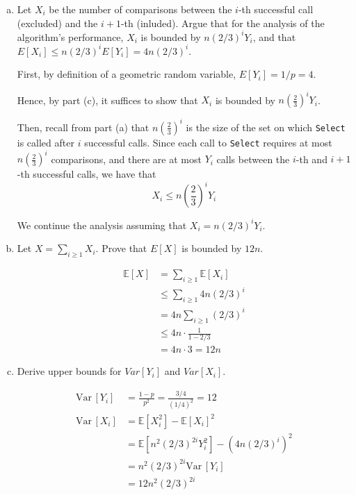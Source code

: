 \documentclass[12pt,letterpaper]{article}
\newcommand{\E}{\mathbb{E}}
\newcommand{\Var}{\text{Var}\,}
\renewcommand{\tt}[1]{\texttt{#1}}
\begin{document}
\begin{enumerate}[a.]
\color{black}

We continue the analysis assuming that for all $i$, the number of calls 
between the $i$-th successful call (excluded) and the $i+1$-th successful call (included) is distributed according to $Y_i$.

\item 
Let $X_i$ be the number of comparisons between the $i$-th successful call (excluded) and the $i+1$-th (inluded). Argue that for the analysis of the algorithm's performance, $X_i$ is bounded by $n(2/3)^i Y_i$, and  that $E[X_i] \leq n(2/3)^i E[Y_i] = 4n(2/3)^i$.

\color{darkblue}
    First, by definition of a geometric random variable, $E[Y_i] = 1/p = 4$. 

    Hence, by part (c), it suffices to show that $X_i$ is bounded by $n\left(\frac{2}{3}\right)^i Y_i$.

    Then, recall from part (a) that $n\left(\frac{2}{3}\right)^i$ is the size of the set on which \tt{Select} is called after $i$ successful calls. Since each call to \tt{Select} requires at most $n\left(\frac{2}{3}\right)^i$ comparisons, and there are at most $Y_i$ calls between the $i$-th and $i+1$-th successful calls, we have that
    \[X_i \leq n\left(\frac{2}{3}\right)^i Y_i\]
\color{black}

We continue the analysis assuming that $X_i = n(2/3)^i Y_i$.

\item Let $X=\sum_{i\geq 1}X_i$. Prove that $E[X]$ is bounded by $12n$.

\color{darkblue}
    \begin{align*}
        \E[X] &= \sum_{i \geq 1} \E[X_i]\\ 
        &\leq \sum_{i \geq 1} 4n(2/3)^i\\
        &= 4n \sum_{i \geq 1} (2/3)^i\\
        &\leq 4n \cdot \frac{1}{1 - 2/3}\\ 
        &= 4n \cdot 3 = 12n
    \end{align*}
\color{black}

\item Derive upper bounds for $Var[Y_i]$ and $Var[X_i]$.

\color{darkblue}
    \begin{align*}
        \Var[Y_i] &= \frac{1-p}{p^2} = \frac{3/4}{(1/4)^2} = 12\\
        \Var[X_i] &= \E[X_i^2] - \E[X_i]^2\\
        &= \E[n^2(2/3)^{2i} Y_i^2] - (4n(2/3)^i)^2\\
        &= n^2(2/3)^{2i} \Var[Y_i]\\
        &= 12 n^2 (2/3)^{2i}
    \end{align*}
\color{black}


\end{enumerate}
\end{document}

